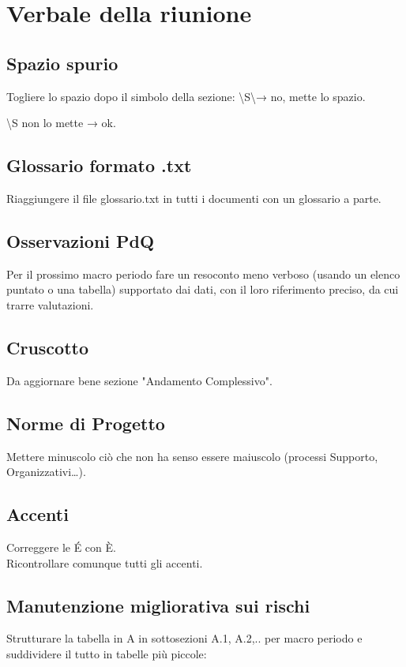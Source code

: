 \section{Verbale della riunione}

\subsection{Spazio spurio}
Togliere lo spazio dopo il simbolo della sezione:
\textbackslash S\textbackslash → no, mette lo spazio.

\textbackslash S non lo mette → ok.

\subsection{Glossario formato .txt}
Riaggiungere il file glossario.txt in tutti i documenti con un glossario a parte.

\subsection{Osservazioni PdQ}
Per il prossimo macro periodo fare un resoconto meno verboso (usando un elenco puntato o una tabella) supportato dai dati, con il loro riferimento preciso, da cui trarre valutazioni.

\subsection{Cruscotto}

Da aggiornare bene sezione "Andamento Complessivo".

\subsection{Norme di Progetto}
Mettere minuscolo ciò che non ha senso essere maiuscolo (processi Supporto, Organizzativi…).

\subsection{Accenti}
Correggere le É con È.\\
Ricontrollare comunque tutti gli accenti.

\subsection{Manutenzione migliorativa sui rischi}
Strutturare la tabella in A in sottosezioni A.1, A.2,.. per macro periodo e suddividere il tutto in tabelle più piccole:\\

